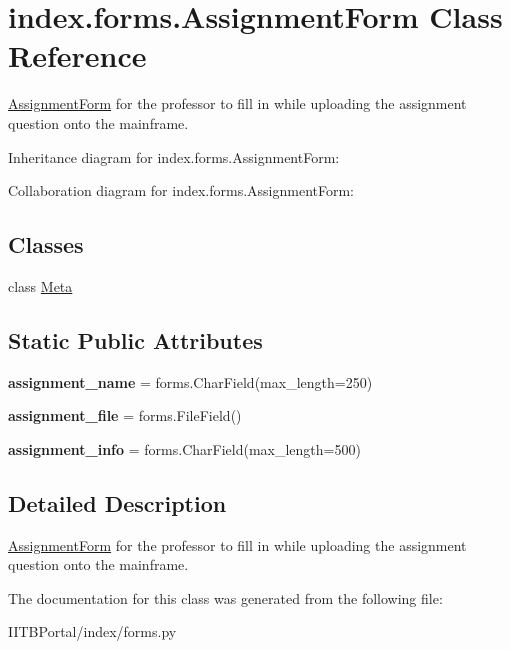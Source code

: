 \hypertarget{classindex_1_1forms_1_1AssignmentForm}{}\section{index.\+forms.\+Assignment\+Form Class Reference}
\label{classindex_1_1forms_1_1AssignmentForm}


\hyperlink{classindex_1_1forms_1_1AssignmentForm}{Assignment\+Form} for the professor to fill in while uploading the assignment question onto the mainframe.  




Inheritance diagram for index.\+forms.\+Assignment\+Form\+:


Collaboration diagram for index.\+forms.\+Assignment\+Form\+:
\subsection*{Classes}
\begin{DoxyCompactItemize}
\item 
class \hyperlink{classindex_1_1forms_1_1AssignmentForm_1_1Meta}{Meta}
\end{DoxyCompactItemize}
\subsection*{Static Public Attributes}
\begin{DoxyCompactItemize}
\item 
\mbox{\label{classindex_1_1forms_1_1AssignmentForm_addaad0a443ab5d8df6b08e585c79ae7d}} 
{\bfseries assignment\+\_\+name} = forms.\+Char\+Field(max\+\_\+length=250)
\item 
\mbox{\label{classindex_1_1forms_1_1AssignmentForm_a4f6f6e7e1bb137baa6a6f075986f2f66}} 
{\bfseries assignment\+\_\+file} = forms.\+File\+Field()
\item 
\mbox{\label{classindex_1_1forms_1_1AssignmentForm_a8cfe4aa4eb170a1ad84e058708e84a86}} 
{\bfseries assignment\+\_\+info} = forms.\+Char\+Field(max\+\_\+length=500)
\end{DoxyCompactItemize}


\subsection{Detailed Description}
\hyperlink{classindex_1_1forms_1_1AssignmentForm}{Assignment\+Form} for the professor to fill in while uploading the assignment question onto the mainframe. 



The documentation for this class was generated from the following file\+:\begin{DoxyCompactItemize}
\item 
I\+I\+T\+B\+Portal/index/forms.\+py\end{DoxyCompactItemize}
